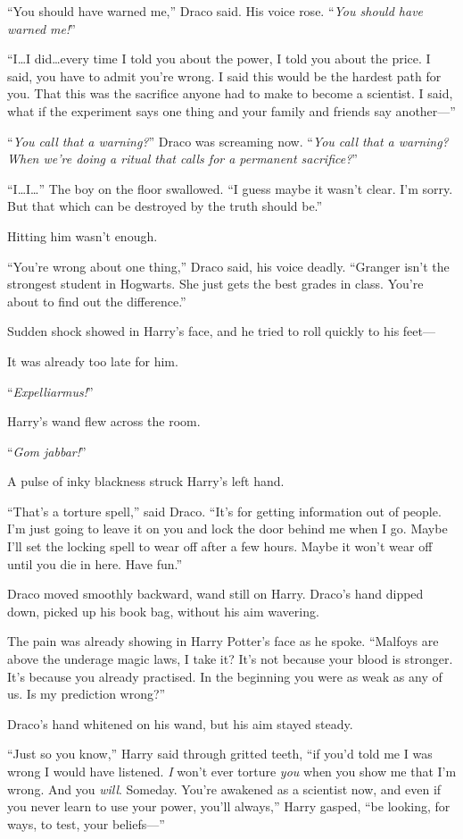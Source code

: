 “You should have warned me,” Draco said. His voice rose. “\emph{You should have warned me!}”

“I…I did…every time I told you about the power, I told you
about the price. I said, you have to admit you’re wrong. I said this would be the hardest path for you. That this was the sacrifice anyone had to make to become a scientist. I said, what if the experiment says one thing and your family and friends say another—”

“\emph{You call that a warning?}” Draco was screaming now. “\emph{You call that a warning? When we’re doing a ritual that calls for a permanent sacrifice?}”

“I…I…” The boy on the floor swallowed. “I guess maybe it wasn’t clear. I’m sorry. But that which can be destroyed by the truth should be.”

Hitting him wasn’t enough.

“You’re wrong about one thing,” Draco said, his voice deadly. “Granger isn’t the strongest student in Hogwarts. She just gets the best grades in class. You’re about to find out the difference.”

Sudden shock showed in Harry’s face, and he tried to roll quickly to his feet—

It was already too late for him.

“\emph{Expelliarmus!}”

Harry’s wand flew across the room.

“\emph{Gom jabbar!}”

A pulse of inky blackness struck Harry’s left hand.

“That’s a torture spell,” said Draco. “It’s for getting information out of people. I’m just going to leave it on you and lock the door behind me when I go. Maybe I’ll set the locking spell to wear off after a few hours. Maybe it won’t wear off until you die in here. Have fun.”

Draco moved smoothly backward, wand still on Harry. Draco’s hand dipped down, picked up his book bag, without his aim wavering.

The pain was already showing in Harry Potter’s face as he spoke. “Malfoys are above the underage magic laws, I take it? It’s not because your blood is stronger. It’s because you already practised. In the beginning you were as weak as any of us. Is my prediction wrong?”

Draco’s hand whitened on his wand, but his aim stayed steady.

“Just so you know,” Harry said through gritted teeth, “if you’d told me I was wrong I would have listened. \emph{I} won’t ever torture \emph{you} when you show me that I’m wrong. And you \emph{will}. Someday. You’re awakened as a scientist now, and even if you never learn to use your power, you’ll always,” Harry gasped, “be looking, for ways, to test, your beliefs—”

